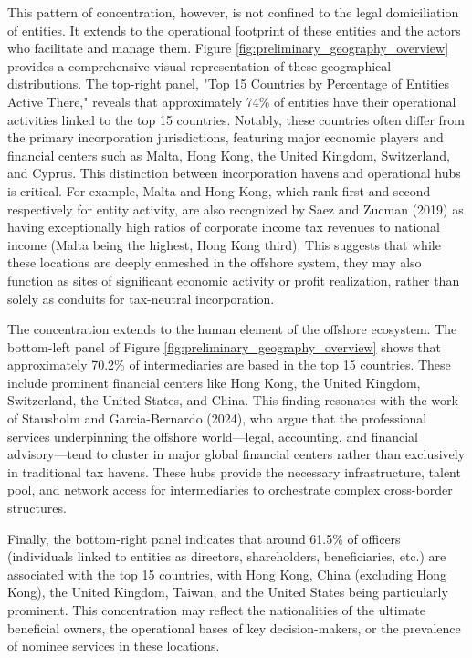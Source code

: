 This pattern of concentration, however, is not confined to the legal domiciliation of entities. It extends to the operational footprint of these entities and the actors who facilitate and manage them. Figure \ref{fig:preliminary_geography_overview} provides a comprehensive visual representation of these geographical distributions. The top-right panel, "Top 15 Countries by Percentage of Entities Active There," reveals that approximately 74\% of entities have their operational activities linked to the top 15 countries. Notably, these countries often differ from the primary incorporation jurisdictions, featuring major economic players and financial centers such as Malta, Hong Kong, the United Kingdom, Switzerland, and Cyprus. This distinction between incorporation havens and operational hubs is critical. For example, Malta and Hong Kong, which rank first and second respectively for entity activity, are also recognized by Saez and Zucman (2019) as having exceptionally high ratios of corporate income tax revenues to national income (Malta being the highest, Hong Kong third). This suggests that while these locations are deeply enmeshed in the offshore system, they may also function as sites of significant economic activity or profit realization, rather than solely as conduits for tax-neutral incorporation.

The concentration extends to the human element of the offshore ecosystem. The bottom-left panel of Figure \ref{fig:preliminary_geography_overview} shows that approximately 70.2\% of intermediaries are based in the top 15 countries. These include prominent financial centers like Hong Kong, the United Kingdom, Switzerland, the United States, and China. This finding resonates with the work of Stausholm and Garcia-Bernardo (2024), who argue that the professional services underpinning the offshore world—legal, accounting, and financial advisory—tend to cluster in major global financial centers rather than exclusively in traditional tax havens. These hubs provide the necessary infrastructure, talent pool, and network access for intermediaries to orchestrate complex cross-border structures.

Finally, the bottom-right panel indicates that around 61.5\% of officers (individuals linked to entities as directors, shareholders, beneficiaries, etc.) are associated with the top 15 countries, with Hong Kong, China (excluding Hong Kong), the United Kingdom, Taiwan, and the United States being particularly prominent. This concentration may reflect the nationalities of the ultimate beneficial owners, the operational bases of key decision-makers, or the prevalence of nominee services in these locations.

